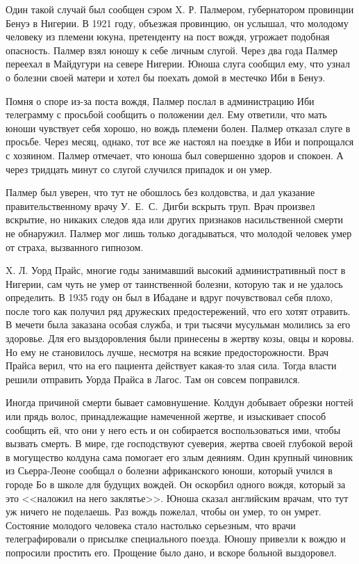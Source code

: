\documentclass[12pt,a4paper,twoside,openany,svgnames]{memoir}
\begin{document}
Один такой случай был сообщен сэром X. Р. Палмером, губернатором провинции Бенуэ в Нигерии. В 1921 году, объезжая провинцию, он услышал, что молодому человеку из племени юкуна, претенденту на пост вождя, угрожает подобная опасность. Палмер взял юношу к себе личным слугой. Через два года Палмер переехал в Майдугури на севере Нигерии. Юноша слуга сообщил ему, что узнал о болезни своей матери и хотел бы поехать домой в местечко Иби в Бенуэ.

Помня о споре из-за поста вождя, Палмер послал в администрацию Иби телеграмму с просьбой сообщить о положении дел. Ему ответили, что мать юноши чувствует себя хорошо, но вождь племени болен. Палмер отказал слуге в просьбе. Через месяц, однако, тот все же настоял на поездке в Иби и попрощался с хозяином. Палмер отмечает, что юноша был совершенно здоров и спокоен. А через тридцать минут со слугой случился припадок и он умер.

Палмер был уверен, что тут не обошлось без колдовства, и дал указание правительственному врачу У.~Е.~С.~Дигби вскрыть труп. Врач произвел вскрытие, но никаких следов яда или других признаков насильственной смерти не обнаружил. Палмер мог лишь только догадываться, что молодой человек умер от страха, вызванного гипнозом.

X. Л. Уорд Прайс, многие годы занимавший высокий административный пост в Нигерии, сам чуть не умер от таинственной болезни, которую так и не удалось определить. В 1935 году он был в Ибадане и вдруг почувствовал себя плохо, после того как получил ряд дружеских предостережений, что его хотят отравить. В мечети была заказана особая служба, и три тысячи мусульман молились за его здоровье. Для его выздоровления были принесены в жертву козы, овцы и коровы. Но ему не становилось лучше, несмотря на всякие предосторожности. Врач Прайса верил, что на его пациента действует какая-то злая сила. Тогда власти решили отправить Уорда Прайса в Лагос. Там он совсем поправился.

Иногда причиной смерти бывает самовнушение. Колдун добывает обрезки ногтей или прядь волос, принадлежащие намеченной жертве, и изыскивает способ сообщить ей, что они у него есть и он собирается воспользоваться ими, чтобы вызвать смерть. В мире, где господствуют суеверия, жертва своей глубокой верой в могущество колдуна сама помогает его злым деяниям. Один крупный чиновник из Сьерра-Леоне сообщал о болезни африканского юноши, который учился в городе Бо в школе для будущих вождей. Он оскорбил одного вождя, который за это <<наложил на него заклятье>>. Юноша сказал английским врачам, что тут уж ничего не поделаешь. Раз вождь пожелал, чтобы он умер, то он умрет. Состояние молодого человека стало настолько серьезным, что врачи телеграфировали о присылке специального поезда. Юношу привезли к вождю и попросили простить его. Прощение было дано, и вскоре больной выздоровел.
\end{document}
